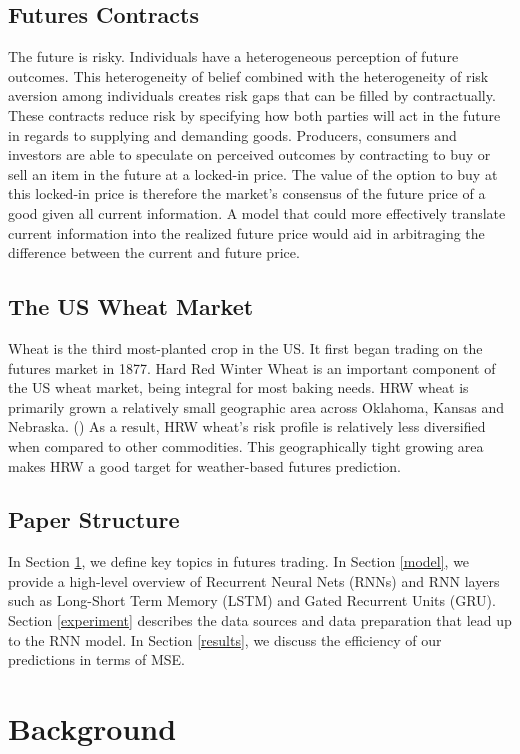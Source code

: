 \documentclass[twoside,11pt]{article}
\begin{document}
\subsection{Futures Contracts}
The future is risky. Individuals have a heterogeneous perception of future outcomes. This heterogeneity of belief combined with the heterogeneity of risk aversion among individuals creates risk gaps that can be filled by contractually. These contracts reduce risk by specifying how both parties will act in the future in regards to supplying and demanding goods. Producers, consumers and investors are able to speculate on perceived outcomes by contracting to buy or sell an item in the future at a locked-in price. The value of the option to buy at this locked-in price is therefore the market's consensus of the future price of a good given all current information. A model that could more effectively translate current information into the realized future price would aid in arbitraging the difference between the current and future price.

\subsection{The US Wheat Market}
Wheat is the third most-planted crop in the US. It first began trading on the futures market in 1877. Hard Red Winter Wheat is an important component of the US wheat market, being integral for most baking needs. HRW wheat is primarily grown a relatively small geographic area across Oklahoma, Kansas and Nebraska. (\cite{CME}) As a result, HRW wheat's risk profile is relatively less diversified when compared to other commodities. This geographically tight growing area makes HRW a good target for weather-based futures prediction. 

\subsection{Paper Structure}
In Section \ref{background}, we define key topics in futures trading. In Section \ref{model}, we provide a high-level overview of Recurrent Neural Nets (RNNs) and RNN layers such as Long-Short Term Memory (LSTM) and Gated Recurrent Units (GRU). Section \ref{experiment} describes the data sources and data preparation that lead up to the RNN model.  In Section \ref{results}, we discuss the efficiency of our predictions in terms of MSE. 

\section{Background} \label{background}
\end{document}
